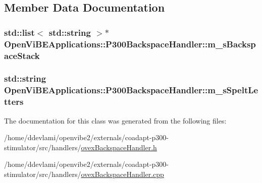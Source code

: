 \subsection{Member Data Documentation}
\hypertarget{classOpenViBEApplications_1_1P300BackspaceHandler_afa97ccc7a5dd74d19eaec79e18f14307}{
\subsubsection[{m\_\-sBackspaceStack}]{\setlength{\rightskip}{0pt plus 5cm}std::list$<$ std::string $>$$\ast$ {\bf OpenViBEApplications::P300BackspaceHandler::m\_\-sBackspaceStack}}}
\label{classOpenViBEApplications_1_1P300BackspaceHandler_afa97ccc7a5dd74d19eaec79e18f14307}
\hypertarget{classOpenViBEApplications_1_1P300BackspaceHandler_a08f247f7d14bc9d476feb5748a3c0b82}{
\subsubsection[{m\_\-sSpeltLetters}]{\setlength{\rightskip}{0pt plus 5cm}std::string {\bf OpenViBEApplications::P300BackspaceHandler::m\_\-sSpeltLetters}}}
\label{classOpenViBEApplications_1_1P300BackspaceHandler_a08f247f7d14bc9d476feb5748a3c0b82}


The documentation for this class was generated from the following files:\begin{DoxyCompactItemize}
\item 
/home/ddevlami/openvibe2/externals/coadapt-\/p300-\/stimulator/src/handlers/\hyperlink{ovexBackspaceHandler_8h}{ovexBackspaceHandler.h}\item 
/home/ddevlami/openvibe2/externals/coadapt-\/p300-\/stimulator/src/handlers/\hyperlink{ovexBackspaceHandler_8cpp}{ovexBackspaceHandler.cpp}\end{DoxyCompactItemize}
